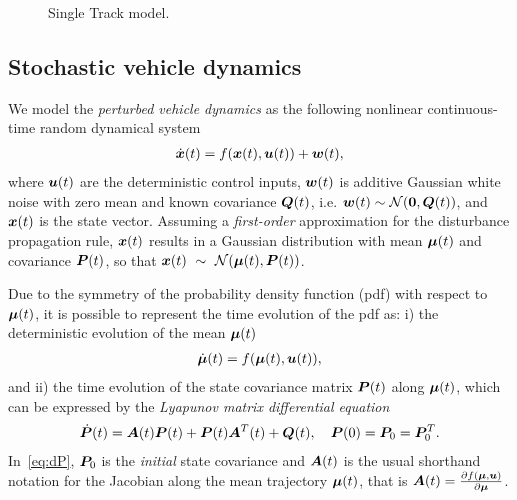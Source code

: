 \begin{figure}
	\centering
	
	\caption{Single Track model.}
	\label{fig:vehicle_model}
\end{figure}

\subsection{Stochastic vehicle dynamics}
\label{sec:stochastic_vehicle_dynamics}

We model the \emph{perturbed vehicle dynamics} as the following nonlinear continuous-time random dynamical system
\begin{align}
\dot{\boldsymbol{x}}(t) = f(\boldsymbol{x}(t), \boldsymbol{u}(t)) + \boldsymbol{w}(t),
\end{align}
where $\boldsymbol{u}(t)$ are the deterministic control inputs, $\boldsymbol{w}(t)$ is additive Gaussian white noise with zero mean and known covariance $\boldsymbol{Q}(t)$, i.e. $\boldsymbol{w}(t) \sim \mathcal{N}(\boldsymbol{0}, \boldsymbol{Q}(t))$, and $\boldsymbol{x}(t)$ is the state vector.
Assuming a \emph{first-order} approximation for the disturbance propagation rule, $\boldsymbol{x}(t)$ results in a Gaussian distribution with mean $\boldsymbol{\mu}(t)$ and covariance $\boldsymbol{P}(t)$, so that $\boldsymbol{x}(t)~\sim~\mathcal{N}(\boldsymbol{\mu}(t), \boldsymbol{P}(t))$.

Due to the symmetry of the probability density function (pdf) with respect to $\boldsymbol{\mu}(t)$, it is possible to represent the time evolution of the pdf as: i) the deterministic evolution of the mean $\boldsymbol{\mu}(t)$
\begin{align}\label{eq:meandynamics}
\dbmu(t) = f(\bmu(t), \bu(t)),
\end{align}
and ii) the time evolution of the state covariance matrix $\boldsymbol{P}(t)$ along $\boldsymbol{\mu}(t)$, which can be expressed by the \emph{Lyapunov matrix differential equation}
\begin{align}\label{eq:dP}
\dbP(t) = \bA(t) \bP(t) + \bP(t) \bA^T(t) + \bQ(t),\quad \bP(0) = \bP_0 = \bP_0^T.
\end{align}
In~\eqref{eq:dP}, $\boldsymbol{P}_0$ is the \emph{initial} state covariance and $\boldsymbol{A}(t)$ is the usual shorthand notation for the Jacobian along the mean trajectory $\boldsymbol{\mu}(t)$, that is $\boldsymbol{A}(t)=\frac{\partial f(\boldsymbol{\mu}, \boldsymbol{u})}{\partial \boldsymbol{\mu}}$.

